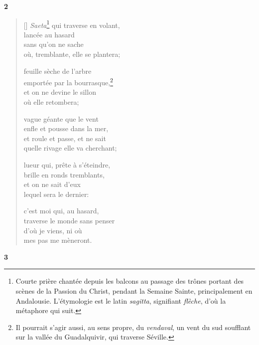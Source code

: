 \documentclass[a4paper,12pt]{book}
\begin{document}
\begin{center}
  \textbf{2}
\end{center}

\settowidth{\versewidth}{où, tremblante, elle se plantera;}

\begin{verse}[\versewidth]
  \emph{Saeta}\footnote{Courte prière chantée
  depuis les balcons au passage des trônes portant des scènes de la
  Passion du Christ, pendant la Semaine Sainte, principalement en
  Andalousie. L'étymologie est le latin \emph{sagitta},
  signifiant \emph{flèche}, d'où la métaphore qui suit.} qui traverse en volant, \\
  lancée au hasard \\
  sans qu'on ne sache \\
  où, tremblante, elle se plantera;

  feuille sèche de l'arbre \\
  emportée par la bourrasque,\footnote{Il pourrait s'agir aussi, au
  sens propre, du \emph{vendaval}, un vent du sud soufflant sur la
  vallée du Guadalquivir, qui traverse Séville.} \\
  et on ne devine le sillon \\
  où elle retombera;

  vague géante que le vent \\
  enfle et pousse dans la mer, \\
  et roule et passe, et ne sait \\
  quelle rivage elle va cherchant;

  lueur qui, prête à s'éteindre, \\
  brille en ronds tremblants, \\
  et on ne sait d'eux \\
  lequel sera le dernier:

  c'est moi qui, au hasard, \\
  traverse le monde sans penser \\
  d'où je viens, ni où \\
  mes pas me mèneront.
\end{verse}

\bigskip

\begin{center}
  \textbf{3}
\end{center}
\end{document}
